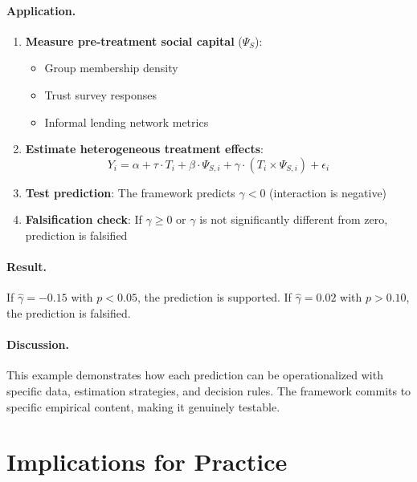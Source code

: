\paragraph{Application.}
\begin{enumerate}
\item \textbf{Measure pre-treatment social capital} ($\Psi_S$):
    \begin{itemize}
    \item Group membership density
    \item Trust survey responses
    \item Informal lending network metrics
    \end{itemize}
\item \textbf{Estimate heterogeneous treatment effects}:
    \begin{equation}
    Y_i = \alpha + \tau \cdot T_i + \beta \cdot \Psi_{S,i} + \gamma \cdot (T_i \times \Psi_{S,i}) + \epsilon_i
    \end{equation}
\item \textbf{Test prediction}: The framework predicts $\gamma < 0$ (interaction is negative)
\item \textbf{Falsification check}: If $\gamma \geq 0$ or $\gamma$ is not significantly different from zero, prediction is falsified
\end{enumerate}

\paragraph{Result.}
If $\hat{\gamma} = -0.15$ with $p < 0.05$, the prediction is supported. If $\hat{\gamma} = 0.02$ with $p > 0.10$, the prediction is falsified.

\paragraph{Discussion.}
This example demonstrates how each prediction can be operationalized with specific data, estimation strategies, and decision rules. The framework commits to specific empirical content, making it genuinely testable.


\section{Implications for Practice}
\label{sec:S-practice}

